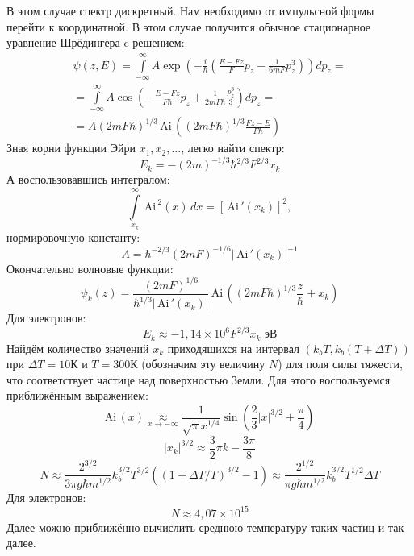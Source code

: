\parbox{\textwidth}{
	\centering
{}
}
В этом случае спектр дискретный. Нам необходимо от импульсной формы перейти к координатной. В этом случае получится обычное стационарное уравнение Шрёдингера c решением:
\[
	\begin{gathered}
	\psi(z, E) = \int\limits_{-\infty}^{\infty} 
	A \exp \left(-\frac{i}{\hbar} \left( \frac{E - Fz}{F} p_z - \frac{1}{6 m F} p_z^3 \right) \right) dp_z = \\ =
	\int\limits_{-\infty}^{\infty} 
	A \cos \left( -\frac{E - Fz}{F \hbar} p_z + \frac{1}{2 m F \hbar} \frac{p_z^3}{3} \right) dp_z
	= \\ =
	A (2 m F \hbar)^{1/3} \mathrm{\,Ai\,} \left((2 m F \hbar)^{1/3}\frac{Fz - E}{F \hbar}\right)	
	\end{gathered}
\]
Зная корни функции Эйри $x_1, x_2, \ldots$, легко найти спектр:
\[
	E_k = - (2 m)^{-1/3} \hbar^{2/3} F^{2/3} x_k
\]
А воспользовавшись интегралом:
\[
	\int\limits_{x_k}^{\infty} \mathrm{\,Ai\,}^2 (x)\,dx = \left[\mathrm{\,Ai\,}' (x_k)\right]^2,
\]
нормировочную константу:
\[
	A = \hbar^{-2/3} (2 m F)^{-1/6} |\mathrm{\,Ai\,}' (x_k)|^{-1}
\]
Окончательно волновые функции:
\[
	\psi_k(z) = \frac{(2mF)^{1/6}}{\hbar^{1/3}|\mathrm{\,Ai\,}' (x_k)|} \mathrm{\,Ai\,} \left((2 m F \hbar)^{1/3} \frac{z}{\hbar} + x_k \right)
\]
Для электронов:
\[
	E_k \approx -1{,}14\times10^{6} F^{2/3} x_k \text{ эВ}
\]
Найдём количество значений $x_k$ приходящихся на интервал $(k_{b}T, k_{b}(T + \Delta T))$ при $\Delta T= 10 $К и $T = 300 $К (обозначим эту величину $N$) для поля силы тяжести, что соответствует частице над поверхностью Земли. Для этого воспользуемся приближённым выражением:
\[
	\mathrm{Ai\,}(x) \underset{x \to -\infty}{\approx} \frac{1}{\sqrt{\pi} x^{1/4}} \sin \left( \frac{2}{3} |x|^{3/2} + \frac{\pi}{4}\right)
\]
\[
	|x_k|^{3/2} \approx \frac{3}{2}\pi k - \frac{3\pi}{8}
\]
\[
	N \approx \frac{2^{3/2}}{3\pi g \hbar m^{1/2}} k_{b}^{3/2} T^{3/2} ((1 + \Delta T/T)^{3/2} - 1) \approx 
	\frac{2^{1/2}}{\pi g \hbar m^{1/2}} k_{b}^{3/2} T^{1/2} \Delta T
\]
Для электронов:
\[
	N \approx 4{,}07\times10^{15}
\]
Далее можно приближённо вычислить среднюю температуру таких частиц и так далее.